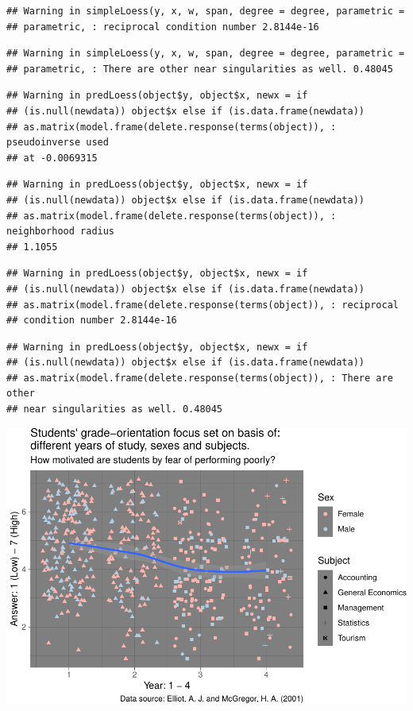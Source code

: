 \documentclass[]{article}
\begin{document}
\begin{verbatim}
## Warning in simpleLoess(y, x, w, span, degree = degree, parametric =
## parametric, : reciprocal condition number 2.8144e-16
\end{verbatim}

\begin{verbatim}
## Warning in simpleLoess(y, x, w, span, degree = degree, parametric =
## parametric, : There are other near singularities as well. 0.48045
\end{verbatim}

\begin{verbatim}
## Warning in predLoess(object$y, object$x, newx = if
## (is.null(newdata)) object$x else if (is.data.frame(newdata))
## as.matrix(model.frame(delete.response(terms(object)), : pseudoinverse used
## at -0.0069315
\end{verbatim}

\begin{verbatim}
## Warning in predLoess(object$y, object$x, newx = if
## (is.null(newdata)) object$x else if (is.data.frame(newdata))
## as.matrix(model.frame(delete.response(terms(object)), : neighborhood radius
## 1.1055
\end{verbatim}

\begin{verbatim}
## Warning in predLoess(object$y, object$x, newx = if
## (is.null(newdata)) object$x else if (is.data.frame(newdata))
## as.matrix(model.frame(delete.response(terms(object)), : reciprocal
## condition number 2.8144e-16
\end{verbatim}

\begin{verbatim}
## Warning in predLoess(object$y, object$x, newx = if
## (is.null(newdata)) object$x else if (is.data.frame(newdata))
## as.matrix(model.frame(delete.response(terms(object)), : There are other
## near singularities as well. 0.48045
\end{verbatim}

\includegraphics{StudentGoals_files/figure-latex/unnamed-chunk-14-1.pdf}
\end{document}
